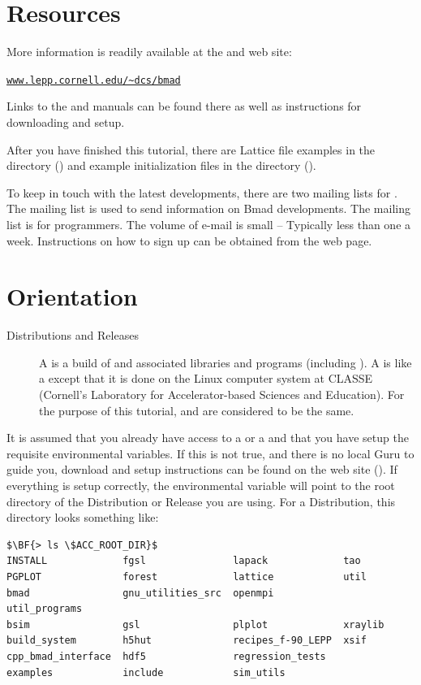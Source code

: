 \documentclass{hitec}
\newcommand{\Section}[1]{\section{#1}\vspace*{-1ex}}
\newenvironment{display}
  {\vspace*{-1.5ex} \begin{alltt}}
  {\end{alltt} \vspace*{-1.0ex}}
\begin{document}
\newpage

\Section{Resources}
\label{s:resources}

More information is readily available at the \bmad and \tao web site:
\begin{display}
  \url{www.lepp.cornell.edu/~dcs/bmad}
\end{display}
Links to the \bmad and \tao manuals can be found there as well as instructions for
downloading and setup.

After you have finished this tutorial, there are Lattice file examples in the 
directory () and example \tao initialization files in the 
directory ().

To keep in touch with the latest \bmad developments, there are two mailing lists for
\bmad.  The  mailing list is used to send information on Bmad developments.  The
 mailing list is for programmers. The volume of e-mail is small -- Typically
less than one a week. Instructions on how to sign up can be obtained from the \bmad web
page.

\Section{Orientation}
\label{s:orientation}

  \begin{description}
  \item[Distributions and Releases] \Newline
A  is a build of \bmad and associated libraries and programs (including \tao).  A
 is like a  except that it is done on the Linux computer system at
CLASSE (Cornell's Laboratory for Accelerator-based Sciences and Education). For the purpose of this
tutorial,  and  are considered to be the same.
  \end{description}

It is assumed that you already have access to a  or a  and that
you have setup the requisite environmental variables. If this is not true, and there is no
local \bmad Guru to guide you, download and setup instructions can be found on the \bmad web
site (). If everything is setup correctly, the environmental variable
 will point to the root directory of the Distribution or Release you are
using. For a Distribution, this directory looks something like:
\begin{lstlisting}[mathescape]
$\BF{> ls \$ACC_ROOT_DIR}$
INSTALL             fgsl               lapack             tao
PGPLOT              forest             lattice            util
bmad                gnu_utilities_src  openmpi            util_programs
bsim                gsl                plplot             xraylib
build_system        h5hut              recipes_f-90_LEPP  xsif
cpp_bmad_interface  hdf5               regression_tests
examples            include            sim_utils
\end{lstlisting}
\end{document}
